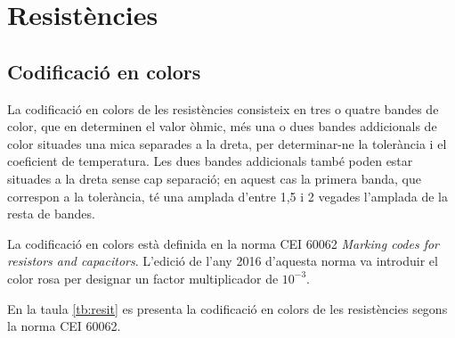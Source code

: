 \chapter{Resistències}

\section{Codificació en colors} \label{sec:resistencies-colors}

La codificació en colors  de les resistències
consisteix en tres o quatre bandes de color, que en determinen el  valor òhmic, més una o dues bandes addicionals de color situades una mica separades a la dreta, per determinar-ne la tolerància i el coeficient de temperatura. Les dues bandes addicionals també poden estar situades a la dreta sense cap separació; en aquest cas la primera banda, que correspon a la tolerància, té una amplada d'entre 1,5 i 2 vegades l'amplada de la resta de bandes.

La codificació en colors està definida en la norma CEI 60062 \textit{Marking codes for resistors and capacitors}. L'edició de l'any 2016 d'aquesta norma va introduir el color rosa per designar un factor multiplicador de $10^{-3}$.

En la taula \vref{tb:resit} es presenta la codificació en colors de les resistències segons la  norma CEI 60062.

